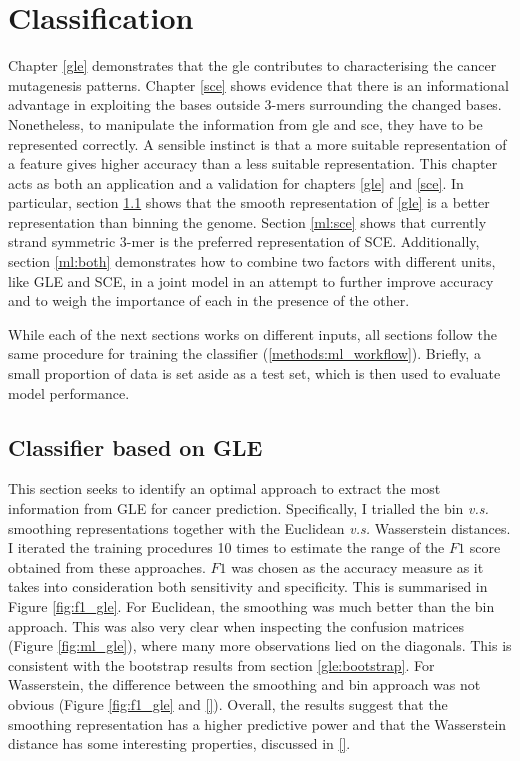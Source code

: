 \chapter{Classification}\label{ml}

Chapter \ref{gle} demonstrates that the \gls{gle} contributes to characterising the cancer mutagenesis patterns. Chapter \ref{sce} shows evidence that there is an informational advantage in exploiting the bases outside 3-mers surrounding the changed bases. Nonetheless, to manipulate the information from \gls{gle} and \gls{sce}, they have to be represented correctly. A sensible instinct is that a more suitable representation of a feature gives higher accuracy than a less suitable representation. This chapter acts as both an application and a validation for chapters \ref{gle} and \ref{sce}. In particular, section \ref{ml:gle} shows that the smooth representation of \ref{gle} is a better representation than binning the genome. Section \ref{ml:sce} shows that currently strand symmetric 3-mer is the preferred representation of SCE. Additionally, section \ref{ml:both} demonstrates how to combine two factors with different units, like GLE and SCE, in a joint model in an attempt to further improve accuracy and to weigh the importance of each in the presence of the other.

While each of the next sections works on different inputs, all sections follow the same procedure for training the classifier (\ref{methods:ml_workflow}). Briefly, a small proportion of data is set aside as a test set, which is then used to evaluate model performance.

\section{Classifier based on GLE}\label{ml:gle}
This section seeks to identify an optimal approach to extract the most information from GLE for cancer prediction. Specifically, I trialled the bin \textit{v.s.} smoothing representations together with the Euclidean \textit{v.s.} Wasserstein distances. I iterated the training procedures 10 times to estimate the range of the $F1$ score obtained from these approaches. $F1$ was chosen as the accuracy measure as it takes into consideration both sensitivity and specificity. This is summarised in Figure \ref{fig:f1_gle}. For Euclidean, the smoothing was much better than the bin approach. This was also very clear when inspecting the confusion matrices (Figure \ref{fig:ml_gle}), where many more observations lied on the diagonals. This is consistent with the bootstrap results from section \ref{gle:bootstrap}. For Wasserstein, the difference between the smoothing and bin approach was not obvious (Figure \ref{fig:f1_gle} and \ref{}). Overall, the results suggest that the smoothing representation has a higher predictive power and that the Wasserstein distance has some interesting properties, discussed in \ref{}.

